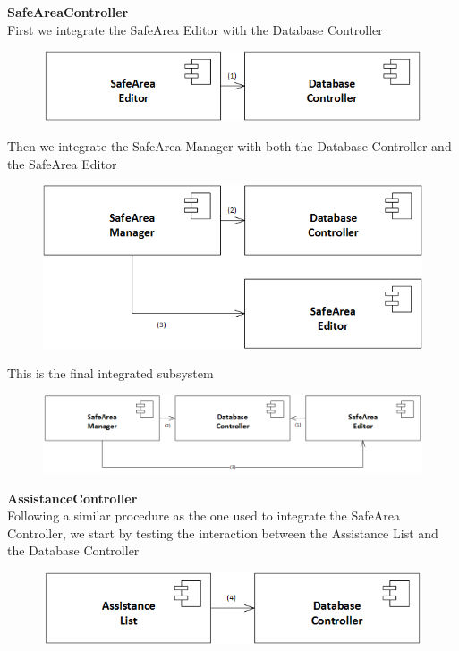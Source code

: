 \documentclass{article}
\begin{document}
\textbf{SafeAreaController}
\\
First we integrate the SafeArea Editor with the Database Controller
\\
\begin{figure}[H]
\includegraphics[scale=0.5]{SafeArea/SafeArea1}
\centering
\end{figure}
Then we integrate the SafeArea Manager with both the Database Controller and the SafeArea Editor
\begin{figure}[H]
\includegraphics[scale=0.5]{SafeArea/SafeArea2}
\centering
\end{figure}
This is the final integrated subsystem
\begin{figure}[H]
\includegraphics[scale=0.5]{SafeArea/SafeAreaControllerIntegration}
\centering
\end{figure}
\textbf{AssistanceController}
\\
Following a similar procedure as the one used to integrate the SafeArea Controller, we start by testing the interaction between the Assistance List and the Database Controller
\begin{figure}[H]
\includegraphics[scale=0.5]{Assistance/Assistance1}
\centering
\end{figure}
\end{document}
